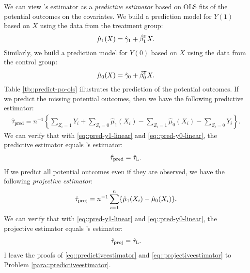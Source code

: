  
We can view \citet{lin2013}'s estimator as a {\it predictive estimator} based on OLS fits of the potential outcomes on the covariates. We build a prediction model for $Y(1)$ based on $X$ using the data from the treatment group: 
\begin{eqnarray}
\label{eq::pred-y1-linear}
\hat{\mu}_1(X) = \hat{\gamma}_1 + \hat{\beta}_1\tran X.
\end{eqnarray}
Similarly, we build a prediction model for $Y(0)$ based on $X$ using the data from the control group: 
\begin{eqnarray}
\label{eq::pred-y0-linear}
\hat{\mu}_0(X)= \hat{\gamma}_0 + \hat{\beta}_0\tran X . 
\end{eqnarray}
Table \ref{tb::predict-po-ols} illustrates the prediction of the potential outcomes. 
If we predict the missing potential outcomes, then we have the following predictive estimator:
\begin{eqnarray}\label{eq::predictive-estimator-generic}
\hat{\tau}_\text{pred} = n^{-1} \left\{   \sum_{Z_i=1}Y_i + \sum_{Z_i=0}\hat{\mu}_1(X_i) - \sum_{Z_i=1} \hat{\mu}_0(X_i) - \sum_{Z_i=0} Y_i     \right\} .
\end{eqnarray}
We can verify that with \eqref{eq::pred-y1-linear} and \eqref{eq::pred-y0-linear}, the predictive estimator equals \citet{lin2013}'s estimator:
\begin{eqnarray}
\label{eq::predictiveestimator}
\hat{\tau}_\text{pred} = \hat{\tau}_\textsc{L}.
\end{eqnarray}
If we predict all potential outcomes even if they are observed, we have the following {\it projective estimator}:
\begin{eqnarray}\label{eq::projective-estimator-generic}
\hat{\tau}_\text{proj} = n^{-1}  \sumn \{ \hat{\mu}_1(X_i) - \hat{\mu}_0(X_i)    \}.
\end{eqnarray}
We can verify that with \eqref{eq::pred-y1-linear} and \eqref{eq::pred-y0-linear}, the projective estimator equals \citet{lin2013}'s estimator:
\begin{eqnarray}
\label{eq::projectiveestimator}
\hat{\tau}_\text{proj} = \hat{\tau}_\textsc{L}.
\end{eqnarray}
I leave the proofs of \eqref{eq::predictiveestimator} and \eqref{eq::projectiveestimator} to Problem \ref{para::predictiveestimator}. 



